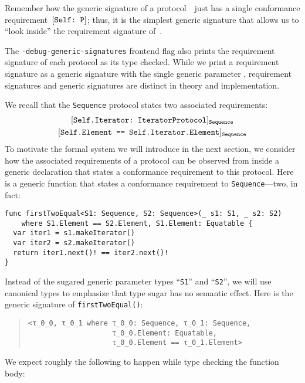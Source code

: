 \documentclass[../generics]{subfiles}
\begin{document}
Remember how the generic signature of a protocol~\tP\ just has a single conformance requirement~$[\texttt{Self:~P}]$; thus, it is the simplest generic signature that allows us to ``look inside'' the requirement signature of~\tP.

The \texttt{-debug-generic-signatures} frontend flag also prints the requirement signature of each protocol as its type checked. While we print a requirement signature as a generic signature with the single generic parameter \tSelf, requirement signatures and generic signatures are distinct in theory and implementation.

\begin{example}\label{motivating derived reqs}
We recall that the \texttt{Sequence} protocol states two associated requirements:
\begin{gather*}
\AssocConfReq{Self.Iterator}{IteratorProtocol}{Sequence}\\
\AssocSameReq{Self.Element}{Self.Iterator.Element}{Sequence}
\end{gather*}
To motivate the formal system we will introduce in the next section, we consider how the associated requirements of a protocol can be observed from inside a generic declaration that states a conformance requirement to this protocol. Here is a generic function that states a conformance requirement to \texttt{Sequence}---two, in fact:
\begin{Verbatim}
func firstTwoEqual<S1: Sequence, S2: Sequence>(_ s1: S1, _ s2: S2)
    where S1.Element == S2.Element, S1.Element: Equatable {
  var iter1 = s1.makeIterator()
  var iter2 = s2.makeIterator()
  return iter1.next()! == iter2.next()!
}
\end{Verbatim}
Instead of the sugared generic parameter types ``\texttt{S1}'' and ``\texttt{S2}'', we will use canonical types to emphasize that type sugar has no semantic effect. Here is the generic signature of \texttt{firstTwoEqual()}:
\begin{quote}
\begin{verbatim}
<τ_0_0, τ_0_1 where τ_0_0: Sequence, τ_0_1: Sequence,
                    τ_0_0.Element: Equatable,
                    τ_0_0.Element == τ_0_1.Element>
\end{verbatim}
\end{quote}
We expect roughly the following to happen while type checking the function body:
\begin{enumerate}

\end{enumerate}
\end{example}
\end{document}
